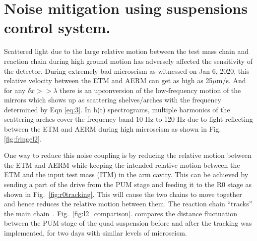 \documentclass[12pt]{iopart}
\begin{document}
\qquad



\section{Noise mitigation using suspensions control system.} \label{rzero}
\quad

Scattered light due to the large relative motion between the test mass chain and reaction chain during high ground motion has adversely affected the sensitivity of the detector. 
During extremely bad microseism as witnessed on Jan 6, 2020, this relative velocity between the ETM and AERM can get as high as 25${\mu}$m/s. And for any ${\delta}x >> {\lambda}$ there is an upconversion of the low-frequency motion of the mirrors which shows up as scattering shelves/arches with the frequency determined by Eqn \ref{eq:3}. In h(t) spectrograms, multiple harmonics of the scattering arches cover the frequency band 10 Hz to 120 Hz due to light reflecting between the ETM and AERM during high microseism as shown in Fig. \ref{fig:fringel2}.

One way to reduce this noise coupling is by reducing the relative motion between the ETM and AERM while keeping the intended relative motion between the ETM and the input test mass (ITM) in the arm cavity. This can be achieved by sending a part of the drive from the PUM stage and feeding it to the R0 stage as shown in Fig.~\ref{fig:r0tracking}. This will cause the two chains to move together and hence reduces the relative motion between them. The reaction chain ``tracks'' the main chain~\cite{alog_robert}. Fig.~\ref{fig:l2_comparison}. compares the distance fluctuation between the PUM stage of the quad suspension before and after the tracking was implemented, for two days with similar levels of microseism.
\end{document}
